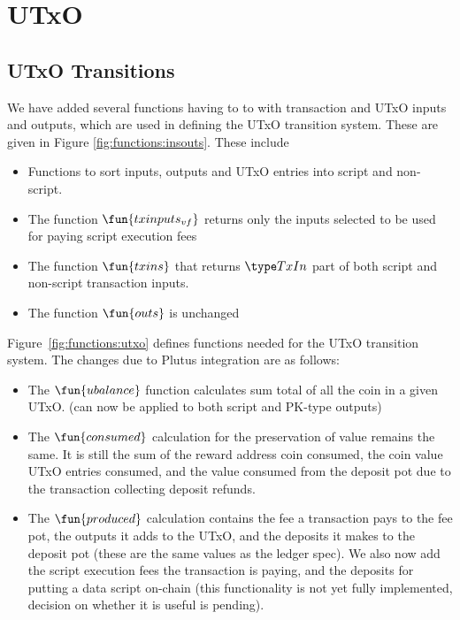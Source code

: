 \section{UTxO}
\label{sec:utxo}


\subsection{UTxO Transitions}
\label{sec:utxo-trans}

We have added several functions having to to with transaction and UTxO inputs and
outputs, which are used in defining the UTxO transition system. These are
given in Figure \ref{fig:functions:insouts}. These include

\begin{itemize}
  \item Functions to
sort inputs, outputs and UTxO entries into script and non-script.

  \item The function $\fun{txinputs_{vf}}$ returns only the inputs selected to be used
for paying script execution fees
  \item The function $\fun{txins}$ that returns $\TxIn$ part of both script
  and non-script transaction inputs.
  \item The function $\fun{outs}$ is unchanged
\end{itemize}

Figure~\ref{fig:functions:utxo} defines functions needed for the UTxO transition system.
The changes due to Plutus integration are as follows:

\begin{itemize}

  \item
    The $\fun{ubalance}$ function calculates sum total of all the coin in a given UTxO.
    (can now be applied to both script and PK-type outputs)

  \item The $\fun{consumed}$ calculation for the preservation of value remains the
  same. It is still the sum of the reward address coin consumed, the coin value
   UTxO entries consumed, and the value consumed from the deposit pot due
   to the transaction collecting deposit refunds.

  \item The $\fun{produced}$ calculation contains the fee a transaction pays
  to the fee pot, the outputs it adds to the UTxO, and the deposits it makes
  to the deposit pot (these are the same values as the ledger spec). We also
  now add the script execution fees the transaction is paying, and the deposits
  for putting a data script on-chain (this functionality is not yet fully
  implemented, decision on whether it is useful is pending).
\end{itemize}


